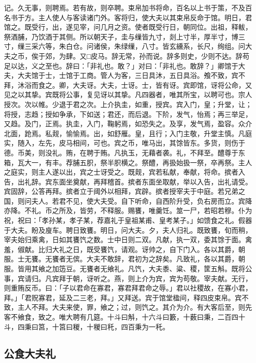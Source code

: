 \documentclass[]{article}
\begin{document}
记。久无事，则聘焉。若有故，则卒聘。束帛加书将命，百名以上书于策，不及百名书于方。主人使人与客读诸门外。客将归，使大夫以其束帛反命于馆。明日，君馆之。既受行，出，遂见宰，问几月之资。使者既受行日，朝同位。出祖，释軷，祭酒脯，乃饮酒于其侧。所以朝天子，圭与缫皆九寸，剡上寸半，厚半寸，博三寸，缫三采六等，朱白仓。问诸侯，朱绿缫，八寸。皆玄纁系，长尺，绚组。问大夫之币，俟于郊，为肆。又□皮马。辞无常，孙而说。辞多则史，少则不达。辞苟足以达，义之至也。辞曰：「非礼也。敢？」对曰：「非礼也。敢辞？」卿馆于大夫，大夫馆于士，士馆于工商。管人为客，三日具沐，五日具浴。飧不致，宾不拜，沐浴而食之。卿，大夫讶。大夫，士讶。士，皆有讶。宾即馆，讶将公命，又见之以其挚。宾既将公事，复见讶以其挚。凡四器者，唯其所宝，以聘可也。宗人授次。次以帷。少退于君之次。上介执圭，如重，授宾。宾入门，皇；升堂，让；将授，志趋；授如争承，下如送；君还，而后退。下阶，发气，怡焉；再三举足，又趋。及门，正焉。执圭，入门，鞠躬焉，如恐失之。及享，发气焉，盈容。众介北面，跄焉。私觌，愉愉焉。出，如舒雁。皇，且行；入门主敬，升堂主慎。凡庭实，随入，左先，皮马相间，可也。宾之币，唯马出，其馀皆东。多货，则伤于德。币美，则没礼。贿，在聘于贿。凡执玉，无藉者袭。礼，不拜至。醴尊于东箱，瓦大一，有丰。荐脯五胑，祭半胑横之。祭醴，再扱始扱一祭，卒再祭。主人之庭实，则主人遂以出，宾之士讶受之。既觌，宾若私献，奉献，将命。摈者入告，出礼辞。宾东面坐奠献，再拜稽首。摈者东面坐取献，举以入告，出礼请受。宾固辞，公答再拜。摈者立于阈外以相拜，宾辟。摈者授宰夫于中庭。若兄弟之国，则问夫人。若君不见，使大夫受。自下听命，自西阶升受，负右房而立。宾降亦降。不礼。币之所及，皆劳，不释服。赐饔，唯羹饪。筮一尸，若昭若穆。仆为祝，祝曰：「孝孙某，孝子某，荐嘉礼于皇祖某甫、皇考某子。」如馈食之礼。假器于大夫。盼及廋车。聘日致饔。明日，问大夫。夕，夫人归礼。既致饔，旬而稍，宰夫始归乘禽，日如其饔饩之数。士中日则二双。凡献，执一双，委其馀于面。禽羞，俶献。比归大礼之日，既受饔饩，请观。讶帅之，自下门入。各以其爵，朝服。士无饔。无饔者无傧。大夫不敢辞，君初为之辞矣。凡致礼，各以其爵，朝服。皆用其飨之加笾豆。无饔者无飨礼。凡饩，大夫黍、粱、稷，筐五斛。既将公事，宾请归。凡宾拜于朝，讶听之。燕，则上介为宾，宾为苟敬。宰夫献。无行，则重贿反币。曰：「子以君命在寡君，寡君拜君命之辱。」君以社稷故，在寡小君，拜。」「君贶寡君，延及二三老，拜。」又拜送。宾于馆堂楹间，释四皮束帛。宾不致，主人不拜。大夫来使，罪，飨之；过，则饩之。其介为介。有大客后至，则先客不飨食，致之。唯大聘有几筵。十斗曰斛，十六斗曰籔，十薮曰秉，二百四十斗，四秉曰筥，十筥曰稯，十稯曰秅，四百秉为一秅。

\hypertarget{header-n44}{%
\subsection{公食大夫礼}\label{header-n44}}
\end{document}

